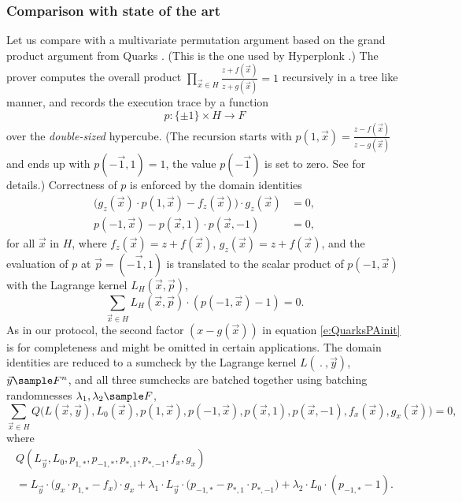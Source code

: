 \documentclass[11pt]{article}
\theoremstyle{definition}
\theoremstyle{remark}
\begin{document}
\subsubsection{Comparison with state of the art}
Let us compare with a multivariate permutation argument based on the grand product argument from Quarks \cite{Quarks}.
(This is the one used by Hyperplonk \cite{Hyperplonk}.)
The prover computes the overall product $\prod_{\vec x\in H} \frac{z + f(\vec x)}{z + g(\vec x)} = 1$ recursively in a tree like manner, and records the execution trace by a function 
\[
p: \{\pm 1\}\times H\rightarrow F
\] 
over the \textit{double-sized} hypercube. 
(The recursion starts with  $p(1,\vec x) = \frac{z - f(\vec x)}{z - g(\vec x)}$ and ends up with $p(-\vec{1}, 1) = 1$,
the value $p(-\vec 1)$ is set to zero. 
See \cite{Quarks} for details.)
Correctness of $p$ is enforced by the domain identities
\begin{align}
\label{e:QuarksPAinit}
\big( g_z(\vec x) \cdot p(1, \vec x) - f_z(\vec x) \big) \cdot g_z(\vec x) &= 0,
\\
p(-1,\vec x) - p(\vec x, 1) \cdot p(\vec x, -1)   &= 0,
\end{align}
for all $\vec x$ in $H$, where $f_z(\vec x) = z + f(\vec x)$, $g_z(\vec x) = z+ f(\vec x)$, and the evaluation of $p$ at $\vec p =(-\vec 1,1)$ is translated to the scalar product of $p(-1, \vec x)$ with the Lagrange kernel $L_H(\vec x, \vec p)$,
\[
\sum_{\vec x \in H} L_H(\vec x, \vec p)\cdot (p(-1, \vec x) - 1) = 0.
\]
As in our protocol, the second factor $(x - g(\vec x))$ in equation \eqref{e:QuarksPAinit} is  for completeness and might be omitted in certain applications.
The domain identities are reduced to a sumcheck by the Lagrange kernel $L(\:.\:, \vec y)$, $\vec y\sample F^n$, and 
all three sumchecks are batched together using batching randomnesses $\lambda_1,\lambda_2\sample F$, 
\[
\sum_{\vec x\in H} Q\big(L(\vec x,\vec y), L_0(\vec x), p(1, \vec x),p(-1,\vec x), p(\vec x, 1), p(\vec x, -1), f_x(\vec x), g_x(\vec x) \big) = 0,
\]
where 
\begin{multline*}
Q(L_{\vec y}, L_0, p_{1,*}, p_{-1,*}, p_{*,1}, p_{*,-1}, f_x, g_x) 
\\=
L_{\vec y} \cdot \big( g_x\cdot p_{1,*} - f_x \big) \cdot g_x
+ \lambda_1\cdot L_{\vec y}\cdot \big( p_{-1,*} -p_{*,1} \cdot p_{*,-1}\big)
+ \lambda_2\cdot  L_0\cdot (p_{-1,*} - 1).
\end{multline*}
\end{document}
